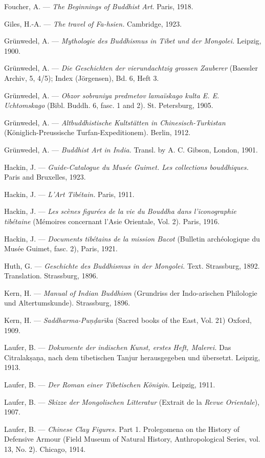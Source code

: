 \documentclass[a4paper, 12pt, oneside]{article}
\begin{document}
Foucher, A. --- \emph{The Beginnings of Buddhist Art}. Paris, 1918.

Giles, H.-A. --- \emph{The travel of Fa-hsien.} Cambridge, 1923.

Grünwedel, A. --- \emph{Mythologie des Buddhismus in Tibet und der Mongolei.} Leipzig, 1900.

Grünwedel, A. --- \emph{Die Geschichten der vierundachtzig grossen Zauberer} (Baessler Archiv, 5, 4/5); Index (Jörgensen), Bd. 6, Heft 3.

Grünwedel, A. --- \emph{Obzor sobraniya predmetov lamaïskago kulta E. E. Uchtomskago} (Bibl. Buddh. 6, fasc. 1 and 2). St. Petersburg, 1905.

Grünwedel, A. --- \emph{Altbuddhistische Kultstätten in Chinesisch-Turkistan} (Königlich-Preussische Turfan-Expeditionem). Berlin, 1912.

Grünwedel, A. --- \emph{Buddhist Art in India.} Transl. by A. C. Gibson, London, 1901.

Hackin, J. --- \emph{Guide-Catalogue du Musée Guimet. Les collections bouddhiques.} Paris and Bruxelles, 1923.

Hackin, J. --- \emph{L'Art Tibétain.} Paris, 1911.

Hackin, J. --- \emph{Les scènes figurées de la vie du Bouddha dans l'iconographie tibétaine} (Mémoires concernant l'Asie Orientale, Vol. 2). Paris, 1916.

Hackin, J. --- \emph{Documents tibétains de la mission Bacot} (Bulletin archéologique du Musée Guimet, fasc. 2), Paris, 1921.

Huth, G. --- \emph{Geschichte des Buddhismus in der Mongolei.} Text. Strassburg, 1892. Translation. Strassburg, 1896.

Kern, H. --- \emph{Manual of Indian Buddhism} (Grundriss der Indo-arischen Philologie und Altertumskunde). Strassburg, 1896.

Kern, H. --- \emph{Saddharma-Pu\d{n}\d{d}ar\={\i}ka} (Sacred books of the East, Vol. 21) Oxford, 1909.

Laufer, B. --- \emph{Dokumente der indischen Kunst, erstes Heft, Malerei.} Das Citralak\d{s}a\d{n}a, nach dem tibetischen Tanjur herausgegeben und übersetzt. Leipzig, 1913.

Laufer, B. --- \emph{Der Roman einer Tibetischen Königin.} Leipzig, 1911.

Laufer, B. --- \emph{Skizze der Mongolischen Litteratur} (Extrait de la \emph{Revue Orientale}), 1907.

Laufer, B. --- \emph{Chinese Clay Figures.} Part 1. Prolegomena on the History of Defensive Armour (Field Museum of Natural History, Anthropological Series, vol. 13, No. 2). Chicago, 1914.
\end{document}
